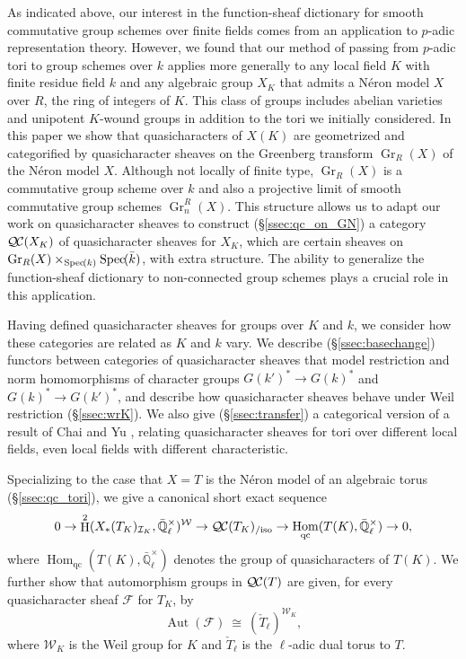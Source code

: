 \documentclass[CM,Submssn,SecEq]{degruyter-crelle} %
\theoremstyle{plain}
\theoremstyle{definition}
\theoremstyle{remark}
\newcommand{\EE}{\mathbb{\bar Q}_\ell}
\newcommand{\bFq}{\bar{k}}
\newcommand{\Fq}{k}
\newcommand{\EEx}{\EE^\times}
\newcommand{\Weil}[1]{\mathcal{W}_{#1}}
\DeclareMathOperator{\Aut}{Aut}
\DeclareMathOperator{\Hom}{Hom}
\DeclareMathOperator{\Gr}{Gr}
\DeclareMathOperator{\Hh}{H}
\newcommand{\Spec}[1]{{\operatorname{Spec}\hskip-1pt( #1 )}}
\newcommand{\iso}{{\ \cong\ }}
\newcommand{\qcs}[1]{{\mathcal{#1}}}
\newcommand{\QC}{{\mathcal{Q\hskip-0.8pt C}}}
\newcommand{\QCiso}[1]{\QC(#1)_{/\text{iso}}}
\begin{document}
As indicated above, our interest in the function-sheaf dictionary for smooth commutative group schemes
over finite fields comes from an application to $p$-adic representation theory. 
However, we found that our method of passing from $p$-adic tori to group schemes over $\Fq$ applies more generally to
any local field $K$ with finite residue field $\Fq$ and any algebraic group $X_K$ that admits a N\'eron model $X$ over $R$, the ring of integers of $K$.
This class of groups includes abelian varieties and unipotent $K$-wound groups in addition to the tori we initially considered.
In this paper we show that quasicharacters of $X(K)$ are geometrized and categorified by quasicharacter sheaves on the
Greenberg transform $\Gr_R(X)$ of the N\'eron model $X$.
Although not locally of finite type, $\Gr_R(X)$ is a commutative group scheme over $\Fq$ and also a projective limit of smooth commutative group schemes $\Gr^R_n(X)$.
This structure allows us to adapt our work on quasicharacter sheaves to construct (\S\ref{ssec:qc_on_GN}) a category $\QC(X_K)$
of quasicharacter sheaves for $X_K$, which are certain sheaves on $\Gr_R(X)\times_{\Spec{\Fq}} \Spec{\bFq}$, with extra structure.
The ability to generalize the function-sheaf dictionary to non-connected group schemes plays a crucial role in this application.

Having defined quasicharacter sheaves for groups over $K$ and $\Fq$, we consider how
these categories are related as $K$ and $\Fq$ vary.  We describe (\S\ref{ssec:basechange}) functors between categories
of quasicharacter sheaves that model restriction and norm homomorphisms of character groups $G(k')^* \to G(k)^*$ and $G(k)^* \to G(k')^*$,
and describe how quasicharacter sheaves behave under Weil restriction (\S\ref{ssec:wrK}).  We also give (\S\ref{ssec:transfer})
a categorical version of a result of Chai and Yu \cite{chai-yu:01a},
relating quasicharacter sheaves for tori over different local fields, even local fields
with different characteristic.

Specializing to the case that $X = T$ is the N\'eron model of an algebraic torus (\S\ref{ssec:qc_tori}), 
we give a canonical short exact sequence 
\[
0 \to \Hh^2(X_*(T_K)_{\mathcal{I}_K},\EEx)^{\Weil{}} \to \QCiso{T_K} \to \Hom_\text{qc}(T(K),\EEx) \to 0,
\]
where $\Hom_\text{qc}(T(K),\EEx)$ denotes the group of quasicharacters of $T(K)$.
We further show that automorphism groups in $\QC(T)$ are given, for every quasicharacter sheaf $\qcs{F}$ for $T_K$, by
\[
\Aut(\qcs{F}) \iso (\check{T}_\ell)^{\Weil{K}},
\]
where $\Weil{K}$ is the Weil group for $K$ and $\check{T}_\ell$ is the $\ell$-adic dual torus to $T$.
\end{document}
